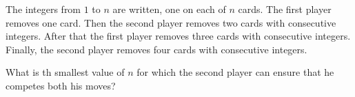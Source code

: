 The integers from $1$ to $n$ are written, one on each of $n$ cards. The first player removes one card. Then the second player removes two cards with consecutive integers. After that the first player removes three cards with consecutive integers. Finally, the second player removes four cards with consecutive integers.

What is th smallest value of $n$ for which the second player can ensure that he competes both his moves?